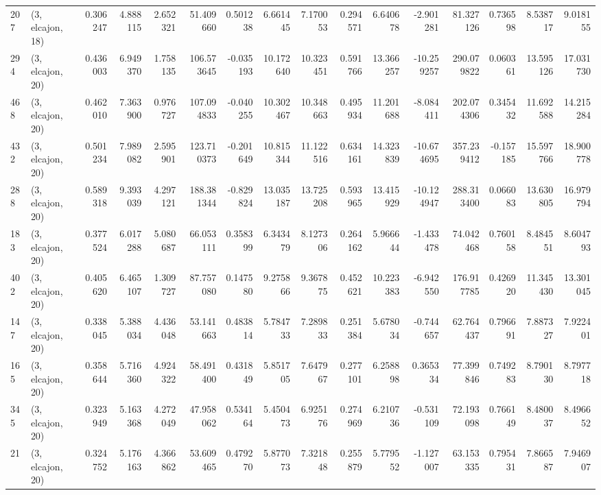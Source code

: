 \begin{tabular}{llrrrrrrrrrrrrrr}
207 &  (3, elcajon, 18) &   0.306247 &   4.888115 &   2.652321 &    51.409660 &   0.501238 &   6.661445 &   7.170053 &  0.294571 &   6.640678 &  -2.901281 &    81.327126 &  0.736598 &   8.538717 &   9.018155 \\
294 &  (3, elcajon, 20) &   0.436003 &   6.949370 &   1.758135 &   106.573645 &  -0.035193 &  10.172640 &  10.323451 &  0.591766 &  13.366257 & -10.259257 &   290.079822 &  0.060361 &  13.595126 &  17.031730 \\
468 &  (3, elcajon, 20) &   0.462010 &   7.363900 &   0.976727 &   107.094833 &  -0.040255 &  10.302467 &  10.348663 &  0.495934 &  11.201688 &  -8.084411 &   202.074306 &  0.345432 &  11.692588 &  14.215284 \\
432 &  (3, elcajon, 20) &   0.501234 &   7.989082 &   2.595901 &   123.710373 &  -0.201649 &  10.815344 &  11.122516 &  0.634161 &  14.323839 & -10.674695 &   357.239412 & -0.157185 &  15.597766 &  18.900778 \\
288 &  (3, elcajon, 20) &   0.589318 &   9.393039 &   4.297121 &   188.381344 &  -0.829824 &  13.035187 &  13.725208 &  0.593965 &  13.415929 & -10.124947 &   288.313400 &  0.066083 &  13.630805 &  16.979794 \\
183 &  (3, elcajon, 20) &   0.377524 &   6.017288 &   5.080687 &    66.053111 &   0.358399 &   6.343479 &   8.127306 &  0.264162 &   5.966644 &  -1.433478 &    74.042468 &  0.760158 &   8.484551 &   8.604793 \\
402 &  (3, elcajon, 20) &   0.405620 &   6.465107 &   1.309727 &    87.757080 &   0.147580 &   9.275866 &   9.367875 &  0.452621 &  10.223383 &  -6.942550 &   176.917785 &  0.426920 &  11.345430 &  13.301045 \\
147 &  (3, elcajon, 20) &   0.338045 &   5.388034 &   4.436048 &    53.141663 &   0.483814 &   5.784733 &   7.289833 &  0.251384 &   5.678034 &  -0.744657 &    62.764437 &  0.796691 &   7.887327 &   7.922401 \\
165 &  (3, elcajon, 20) &   0.358644 &   5.716360 &   4.924322 &    58.491400 &   0.431849 &   5.851705 &   7.647967 &  0.277101 &   6.258898 &   0.365334 &    77.399846 &  0.749283 &   8.790130 &   8.797718 \\
345 &  (3, elcajon, 20) &   0.323949 &   5.163368 &   4.272049 &    47.958062 &   0.534164 &   5.450473 &   6.925176 &  0.274969 &   6.210736 &  -0.531109 &    72.193098 &  0.766149 &   8.480037 &   8.496652 \\
21  &  (3, elcajon, 20) &   0.324752 &   5.176163 &   4.366862 &    53.609465 &   0.479270 &   5.877073 &   7.321848 &  0.255879 &   5.779552 &  -1.127007 &    63.153335 &  0.795431 &   7.866587 &   7.946907 \\

\end{tabular}

